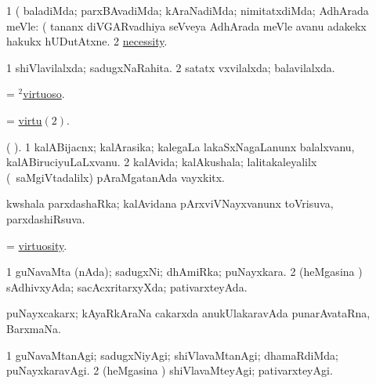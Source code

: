 \noindent 
\gl{\pagu}
\expl{}
\bmng
\bnum
\num{1}  (  baladiMda; parxBAvadiMda; kAraNadiMda; nimitatxdiMda; AdhArada meVle:  (  tananx diVGARvadhiya seVveya AdhArada meVle avanu adakekx hakukx hUDutAtxne. 
\num{2}  \hyperref{kandict_n.pdf}{N}{necessity pagu(3)}{necessity}. 
\enum
\emng
\eentry

\bentry 
{} 
\gl{\gu}
\expl{}
\bmng
\bnum
\num{1} shiVlavilalxda; sadugxNaRahita. 
\num{2} satatx vxvilalxda; balavilalxda. 
\enum
\emng
\eentry

\bentry 
{} 
\gl{\gu}
\expl{}
\bmng
 = \hyperlink{virtuoso(2)}{$^2$virtuoso}. 
\emng
\eentry

\bentry 
{} 
\gl{\nA}
\expl{}
\bmng
 = \hyperlink{virtu(2)}{virtu\((2)\)}. 
\emng
\eentry
 
\bentry
{} 
\gl{\nA}(\bava {}
).  
\bmng
\bnum
\num{1} kalABijacnx; kalArasika; kalegaLa lakaSxNagaLanunx balalxvanu, kalABiruciyuLaLxvanu. 
\num{2} kalAvida; kalAkushala; lalitakaleyalilx (\kanmu\ saMgiVtadalilx) pAraMgatanAda vayxkitx. 
\enum
\emng
\eentry

\bentry
{} 
\gl{\gu}
\expl{}
\bmng
 kwshala parxdashaRka; kalAvidana pArxviVNayxvanunx toVrisuva, parxdashiRsuva. 
\emng
\eentry

\bentry
{} 
\gl{\nA}
\expl{}
\bmng
 = \hyperlink{virtuosity}{virtuosity}. 
\emng
\eentry

\bentry
{} 
\gl{\gu}
\expl{}
\bmng
\bnum
\num{1} guNavaMta (nAda); sadugxNi; dhAmiRka; puNayxkara. 
\num{2} (heMgasina \vi) sAdhivxyAda; sacAcxritarxyXda; pativarxteyAda. 
\enum
\emng
\eentry

\bentry
{}
\gl{\nA}
\expl{}
\bmng
 puNayxcakarx; kAyaRkAraNa cakarxda anukUlakaravAda punarAvataRna, BarxmaNa. 
\emng
\eentry

\bentry
{} 
\gl{\kirxvi}
\expl{}
\bmng
\bnum
\num{1} guNavaMtanAgi; sadugxNiyAgi; shiVlavaMtanAgi; dhamaRdiMda; puNayxkaravAgi. 
\num{2} (heMgasina \vi) shiVlavaMteyAgi; pativarxteyAgi. 
\enum
\emng
\eentry

